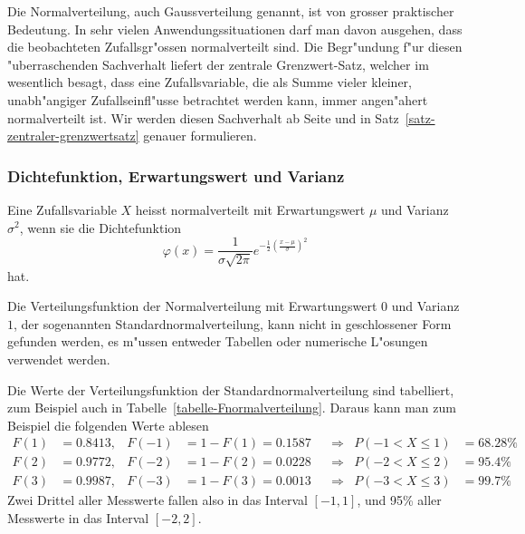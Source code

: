 Die Normalverteilung, auch Gaussverteilung genannt, ist von grosser praktischer
Bedeutung. In sehr vielen Anwendungssituationen darf man davon ausgehen,
dass die beobachteten Zufallsgr"ossen normalverteilt sind. Die Begr"undung
f"ur diesen "uberraschenden Sachverhalt liefert der zentrale Grenzwert-Satz,
welcher im wesentlich besagt, dass eine Zufallsvariable, die als Summe vieler
kleiner, unabh"angiger Zufallseinfl"usse betrachtet werden kann, immer
angen"ahert normalverteilt ist.
Wir werden diesen Sachverhalt ab Seite \pageref{zentraler-grenzwertsatz}
und in Satz~\ref{satz-zentraler-grenzwertsatz} genauer formulieren.

\subsubsection{Dichtefunktion, Erwartungswert und Varianz}
\begin{definition}
Eine Zufallsvariable $X$ heisst normalverteilt mit Erwartungswert $\mu$ und
Varianz $\sigma^2$, wenn sie die
Dichtefunktion
\[
\varphi(x)=\frac1{\sigma\sqrt{2\pi}}e^{-\frac{1}{2}
\left(\frac{x-\mu}{\sigma}\right)^2}
\]
hat.
\end{definition}
%
%
Die Verteilungsfunktion der Normalverteilung mit Erwartungswert $0$
und Varianz $1$, der sogenannten Standardnormalverteilung, kann nicht in
geschlossener Form gefunden werden, es m"ussen entweder Tabellen
oder numerische L"osungen verwendet werden.

Die Werte der Verteilungsfunktion der Standardnormalverteilung sind 
tabelliert, zum Beispiel auch in Tabelle~\ref{tabelle-Fnormalverteilung}.
Daraus kann man zum Beispiel die folgenden Werte ablesen
\begin{align*}
F(1)&=0.8413,&F(-1)&=1-F(1)=0.1587&&\Rightarrow&P(-1<X\le 1)&=68.28\%\\
F(2)&=0.9772,&F(-2)&=1-F(2)=0.0228&&\Rightarrow&P(-2<X\le 2)&=95.4\%\\
F(3)&=0.9987,&F(-3)&=1-F(3)=0.0013&&\Rightarrow&P(-3<X\le 3)&=99.7\%
\end{align*}
Zwei Drittel aller Messwerte fallen also in das Interval $[-1,1]$, und 95\%
aller Messwerte in das Interval $[-2,2]$.


